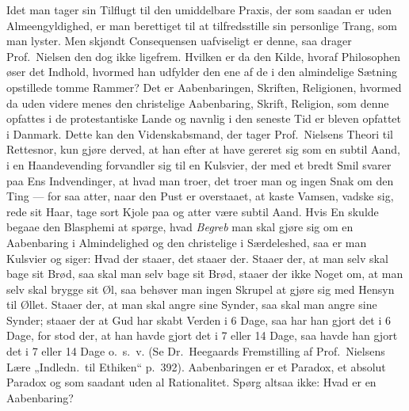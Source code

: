 Idet man tager sin Tilflugt til den umiddelbare
Praxis, der som saadan er uden Almeengyldighed, er man berettiget
til at tilfredsstille sin personlige Trang, som man lyster. Men skjøndt
Consequensen uafviseligt er denne, saa drager Prof.\ Nielsen den dog ikke
ligefrem. Hvilken er da den Kilde, hvoraf Philosophen øser det Indhold,
hvormed han udfylder den ene af de i den almindelige Sætning opstillede tomme
Rammer? Det er Aabenbaringen, Skriften, Religionen, hvormed da uden videre
menes den christelige Aabenbaring, Skrift, Religion, som denne opfattes i de
protestantiske Lande og navnlig i den seneste Tid er bleven opfattet i
Danmark. Dette kan den Videnskabsmand, der tager Prof.\ Nielsens Theori til
Rettesnor, kun gjøre derved, at han efter at have gereret sig som en subtil
Aand, i en Haandevending forvandler sig til en Kulsvier, der med et bredt Smil
svarer paa Ens Indvendinger, at hvad man troer, det troer man og ingen Snak om
den Ting --- for saa atter, naar den Pust er overstaaet, at kaste Vamsen,
vadske sig, rede sit Haar, tage sort Kjole paa og atter være subtil Aand. Hvis
En skulde begaae den Blasphemi at spørge, hvad \emph{Begreb} man skal gjøre
sig om en Aabenbaring i Almindelighed og den christelige i Særdeleshed, saa er
man Kulsvier og siger: Hvad der staaer, det staaer der. Staaer der, at man
selv skal bage sit Brød, saa skal man selv bage sit Brød, staaer der ikke
Noget om, at man selv skal brygge sit Øl, saa behøver man ingen Skrupel at
gjøre sig med Hensyn til Øllet. Staaer der, at man skal angre sine
Synder, saa skal man angre sine Synder; staaer der at Gud har skabt
Verden i 6 Dage, saa har han gjort det i 6 Dage, for stod der, at han havde
gjort det i 7 eller 14 Dage, saa havde han gjort det i 7 eller 14 Dage o.\ s.\
v. (Se Dr.\ Heegaards Fremstilling af Prof.\ Nielsens Lære „Indledn.\ til
Ethiken“ p.\ 392). Aabenbaringen er et Paradox, et absolut Paradox og som
saadant uden al Rationalitet. Spørg altsaa ikke: Hvad er en Aabenbaring?
